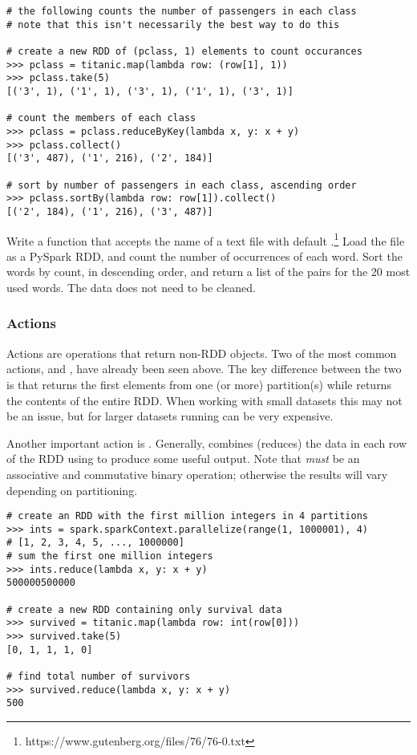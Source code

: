 \begin{lstlisting}
# the following counts the number of passengers in each class
# note that this isn't necessarily the best way to do this

# create a new RDD of (pclass, 1) elements to count occurances
>>> pclass = titanic.map(lambda row: (row[1], 1))
>>> pclass.take(5)
[('3', 1), ('1', 1), ('3', 1), ('1', 1), ('3', 1)]

# count the members of each class
>>> pclass = pclass.reduceByKey(lambda x, y: x + y)
>>> pclass.collect()
[('3', 487), ('1', 216), ('2', 184)]

# sort by number of passengers in each class, ascending order
>>> pclass.sortBy(lambda row: row[1]).collect()
[('2', 184), ('1', 216), ('3', 487)]
\end{lstlisting}

\begin{problem}
Write a function that accepts the name of a text file with default .\footnote{https://www.gutenberg.org/files/76/76-0.txt}
Load the file as a PySpark RDD, and count the number of occurrences of each word.
Sort the words by count, in descending order, and return a list of the  pairs for the 20 most used words. The data does not need to be cleaned.
\label{prob:spark-rdd-hello-world}
\end{problem}

\subsubsection*{Actions}
Actions are operations that return non-RDD objects.
Two of the most common actions,  and , have already been seen above.
The key difference between the two is that  returns the first  elements from one (or more) partition(s) while  returns the contents of the entire RDD.
When working with small datasets this may not be an issue, but for larger datasets running  can be very expensive.

Another important action is . Generally,  combines (reduces) the data in each row of the RDD using  to produce some useful output. 
Note that  \textit{must} be an associative and commutative binary operation; otherwise the results will vary depending on partitioning.

\begin{lstlisting}
# create an RDD with the first million integers in 4 partitions
>>> ints = spark.sparkContext.parallelize(range(1, 1000001), 4)
# [1, 2, 3, 4, 5, ..., 1000000]
# sum the first one million integers
>>> ints.reduce(lambda x, y: x + y)
500000500000

# create a new RDD containing only survival data
>>> survived = titanic.map(lambda row: int(row[0]))
>>> survived.take(5)
[0, 1, 1, 1, 0]

# find total number of survivors
>>> survived.reduce(lambda x, y: x + y)
500
\end{lstlisting}

